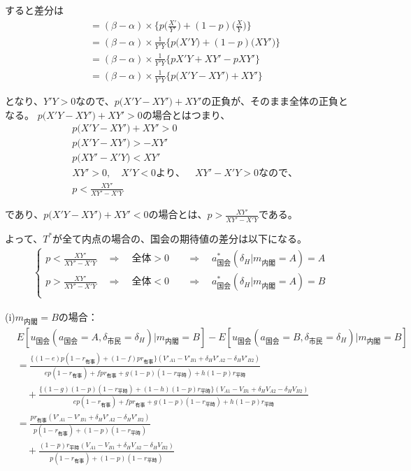 \documentclass[main.tex]{subfiles}
\begin{document}
すると差分は
\begin{align*}
    &= (\beta - \alpha) × \Big\{  p \Big( \frac{X'}{Y'} \Big) +(1-p) \Big(  \frac{X}{Y} \Big) \Big\}\\[1em]
    &= (\beta - \alpha) × \frac{1}{Y'Y} \Big\{  p \Big( X'Y \Big) +(1-p) \Big(  XY' \Big) \Big\}\\[1em]
    &= (\beta - \alpha) × \frac{1}{Y'Y} \Big\{  p X'Y  + XY' -p XY'  \Big\}\\[1em]
    &= (\beta - \alpha) × \frac{1}{Y'Y} \Big\{  p \Big( X'Y - XY' \Big) + XY'   \Big\}
\end{align*}

となり、$Y'Y>0$なので、$ p \Big( X'Y - XY' \Big) + XY'$の正負が、そのまま全体の正負となる。
$p \Big( X'Y - XY' \Big) + XY'>0$の場合とはつまり、
\begin{align*}
    & p \Big( X'Y - XY' \Big) + XY' > 0\\
    & p \Big( X'Y - XY' \Big)  > -  XY'\\
    & p \Big(XY' - X'Y  \Big)  <  XY'\\[0.5em]
    & XY'>0,\quad X'Y<0より、\quad XY' - X'Y>0なので、\\[1em]
    & p   <  \frac{XY'}{XY' - X'Y}
\end{align*}

であり、$p \Big( X'Y - XY' \Big) + XY'<0$の場合とは、$p   >  \frac{XY'}{XY' - X'Y}$である。


よって、$T^*$が全て内点の場合の、国会の期待値の差分は以下になる。
\begin{align*}
    \begin{cases}
        p < \frac{XY'}{XY' - X'Y} \quad\Rightarrow\quad 全体>0 &\quad\Rightarrow\quad a^*_{国会}(\delta_H|m_{内閣} = A) = A\\[0.5em]
        p > \frac{XY'}{XY' - X'Y} \quad\Rightarrow\quad 全体<0 &\quad\Rightarrow\quad a^*_{国会}(\delta_H|m_{内閣} = A) = B\\[0.5em] 
     \end{cases}
\end{align*}


\bigskip
(i)$m_{内閣}=B$の場合：
\begin{align*}
    & E[u_{国会}(a_{国会}=A, \delta_{市民}=\delta_H) | m_{内閣} = B  ] - E[u_{国会}(a_{国会}=B, \delta_{市民}=\delta_H) | m_{内閣} = B  ]\\[1em]
    &= \frac{ \{(1-e)p(1-r_{有事}) +  (1-f)pr_{有事}\}(V'_{A1} -V'_{B1} + \delta_H V'_{A2} - \delta_H V'_{B2})  }{ ep(1-r_{有事}) + fpr_{有事} + g(1-p)(1-r_{平時}) + h(1-p)r_{平時} }\\[1em]
    &\quad + \frac{ \{(1-g)(1-p)(1-r_{平時}) + (1-h)(1-p)r_{平時}\}(V_{A1} - V_{B1} + \delta_H V_{A2} - \delta_H V_{B2} ) }{ ep(1-r_{有事}) + fpr_{有事} + g(1-p)(1-r_{平時}) + h(1-p)r_{平時} }\\[1em]
    &= \frac{  pr_{有事}(V'_{A1} -V'_{B1} + \delta_H V'_{A2} - \delta_H V'_{B2})  }{ p(1-r_{有事}) +(1-p)(1-r_{平時})  }\\[1em]
    &\quad + \frac{ (1-p)r_{平時}(V_{A1} - V_{B1} + \delta_H V_{A2} - \delta_H V_{B2} ) }{ p(1-r_{有事}) + (1-p)(1-r_{平時})  }
\end{align*}
\end{document}
